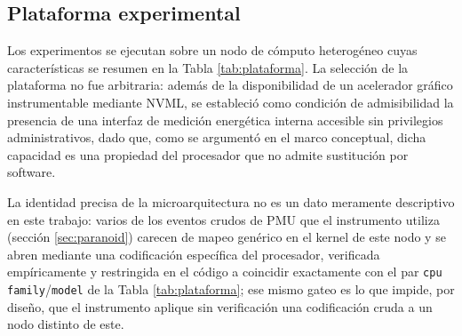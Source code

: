 \documentclass[12pt,oneside,spanish]{book}
\begin{document}
\subsection{Plataforma experimental}

Los experimentos se ejecutan sobre un nodo de cómputo heterogéneo cuyas características se resumen en la Tabla \ref{tab:plataforma}. La selección de la plataforma no fue arbitraria: además de la disponibilidad de un acelerador gráfico instrumentable mediante NVML, se estableció como condición de admisibilidad la presencia de una interfaz de medición energética interna accesible sin privilegios administrativos, dado que, como se argumentó en el marco conceptual, dicha capacidad es una propiedad del procesador que no admite sustitución por software.

La identidad precisa de la microarquitectura no es un dato meramente descriptivo en este trabajo: varios de los eventos crudos de PMU que el instrumento utiliza (sección \ref{sec:paranoid}) carecen de mapeo genérico en el kernel de este nodo y se abren mediante una codificación específica del procesador, verificada empíricamente y restringida en el código a coincidir exactamente con el par \texttt{cpu family}/\texttt{model} de la Tabla \ref{tab:plataforma}; ese mismo gateo es lo que impide, por diseño, que el instrumento aplique sin verificación una codificación cruda a un nodo distinto de este.
\end{document}
